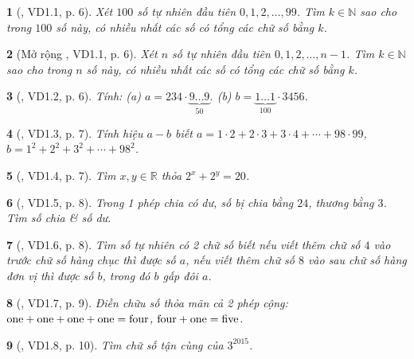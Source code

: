 \documentclass{article}
\newtheorem{baitoan}{}
\begin{document}
\begin{baitoan}[\cite{TLCT_THCS_Toan_6_so_hoc}, VD1.1, p. 6]
	Xét $100$ số tự nhiên đầu tiên $0,1,2,\ldots,99$. Tìm $k\in\mathbb{N}$ sao cho trong $100$ số này, có nhiều nhất các số có tổng các chữ số bằng $k$.
\end{baitoan}

\begin{baitoan}[Mở rộng \cite{TLCT_THCS_Toan_6_so_hoc}, VD1.1, p. 6]
	Xét $n$ số tự nhiên đầu tiên $0,1,2,\ldots,n - 1$. Tìm $k\in\mathbb{N}$ sao cho trong $n$ số này, có nhiều nhất các số có tổng các chữ số bằng $k$.
\end{baitoan}

\begin{baitoan}[\cite{TLCT_THCS_Toan_6_so_hoc}, VD1.2, p. 6]
	Tính: (a) $a = 234\cdot\underbrace{9\ldots9}_{50}$. (b) $b = \underbrace{1\ldots1}_{100}\cdot3456$.
\end{baitoan}

\begin{baitoan}[\cite{TLCT_THCS_Toan_6_so_hoc}, VD1.3, p. 7]
	Tính hiệu $a - b$ biết $a = 1\cdot2 + 2\cdot3 + 3\cdot4 + \cdots + 98\cdot99$, $b = 1^2 + 2^2 + 3^2 + \cdots + 98^2$.
\end{baitoan}

\begin{baitoan}[\cite{TLCT_THCS_Toan_6_so_hoc}, VD1.4, p. 7]
	Tìm $x,y\in\mathbb{R}$ thỏa $2^x + 2^y = 20$.
\end{baitoan}

\begin{baitoan}[\cite{TLCT_THCS_Toan_6_so_hoc}, VD1.5, p. 8]
	Trong 1 phép chia có dư, số bị chia bằng $24$, thương bằng $3$. Tìm số chia \& số dư.
\end{baitoan}

\begin{baitoan}[\cite{TLCT_THCS_Toan_6_so_hoc}, VD1.6, p. 8]
	Tìm số tự nhiên có 2 chữ số biết nếu viết thêm chữ số $4$ vào trước chữ số hàng chục thì được số $a$, nếu viết thêm chữ số $8$ vào sau chữ số hàng đơn vị thì được số $b$, trong đó $b$ gấp đôi $a$.
\end{baitoan}

\begin{baitoan}[\cite{TLCT_THCS_Toan_6_so_hoc}, VD1.7, p. 9]
	Điền chữu số thỏa mãn cả 2 phép cộng: $\rm one + one + one + one = four$, $\rm four + one = five$.
\end{baitoan}

\begin{baitoan}[\cite{TLCT_THCS_Toan_6_so_hoc}, VD1.8, p. 10]
	Tìm chữ số tận cùng của $3^{2015}$.
\end{baitoan}
\end{document}
